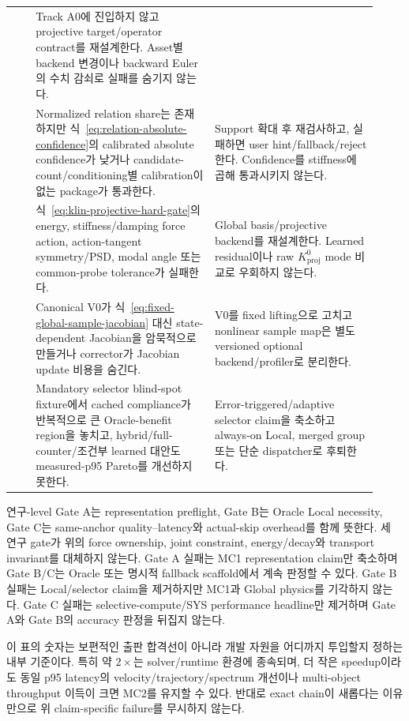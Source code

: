 \documentclass[11pt,a4paper]{article}
\begin{document}
\begin{longtable}{L{0.06\linewidth}L{0.45\linewidth}L{0.41\linewidth}}
& Track A0에 진입하지 않고 projective target/operator contract를 재설계한다.
Asset별 backend 변경이나 backward Euler의 수치 감쇠로 실패를 숨기지 않는다. \\
 & Normalized relation share는 존재하지만 식~\eqref{eq:relation-absolute-confidence}의
calibrated absolute confidence가 낮거나 candidate-count/conditioning별 calibration이 없는 package가 통과한다.
& Support 확대 후 재검사하고, 실패하면 user hint/fallback/reject한다. Confidence를 stiffness에 곱해 통과시키지 않는다. \\
 & 식~\eqref{eq:klin-projective-hard-gate}의 energy, stiffness/damping force action,
action-tangent symmetry/PSD, modal angle 또는 common-probe tolerance가 실패한다.
& Global basis/projective backend를 재설계한다. Learned residual이나 raw \(K_{\mathrm{proj}}^0\) mode 비교로 우회하지 않는다. \\
 & Canonical V0가 식~\eqref{eq:fixed-global-sample-jacobian} 대신 state-dependent Jacobian을
암묵적으로 만들거나 corrector가 Jacobian update 비용을 숨긴다.
& V0를 fixed lifting으로 고치고 nonlinear sample map은 별도 versioned optional backend/profiler로 분리한다. \\
 & Mandatory selector blind-spot fixture에서 cached compliance가 반복적으로 큰 Oracle-benefit region을 놓치고,
hybrid/full-counter/조건부 learned 대안도 measured-p95 Pareto를 개선하지 못한다.
& Error-triggered/adaptive selector claim을 축소하고 always-on Local, merged group 또는 단순 dispatcher로 후퇴한다. \\
\bottomrule
\end{longtable}

연구-level Gate A는 representation preflight, Gate B는 Oracle Local necessity,
Gate C는 same-anchor quality--latency와 actual-skip overhead를 함께 뜻한다.
세 연구 gate가 위의 force ownership, joint constraint, energy/decay와 transport invariant를 대체하지 않는다.
Gate A 실패는 MC1 representation claim만 축소하며 Gate B/C는 Oracle 또는
명시적 fallback scaffold에서 계속 판정할 수 있다.
Gate B 실패는 Local/selector claim을 제거하지만 MC1과 Global physics를 기각하지 않는다.
Gate C 실패는 selective-compute/SYS performance headline만 제거하며
Gate A와 Gate B의 accuracy 판정을 뒤집지 않는다.

이 표의 숫자는 보편적인 출판 합격선이 아니라 개발 자원을 어디까지 투입할지 정하는 내부 기준이다.
특히 약 \(2\times\)는 solver/runtime 환경에 종속되며, 더 작은 speedup이라도
동일 p95 latency의 velocity/trajectory/spectrum 개선이나 multi-object throughput 이득이 크면 MC2를 유지할 수 있다.
반대로 exact chain이 새롭다는 이유만으로 위 claim-specific failure를 무시하지 않는다.
\end{document}
